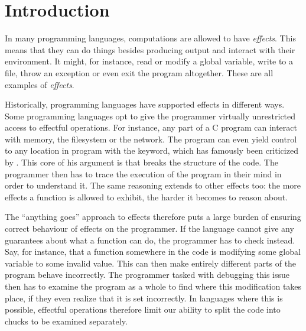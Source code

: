 \chapter{Introduction}\label{chap:introduction}



In many programming languages, computations are allowed to have \emph{effects}. This means that they can do things besides producing output and interact with their environment. It might, for instance, read or modify a global variable, write to a file, throw an exception or even exit the program altogether. These are all examples of \emph{effects}.

Historically, programming languages have supported effects in different ways. Some programming languages opt to give the programmer virtually unrestricted access to effectful operations. For instance, any part of a C program can interact with memory, the filesystem or the network. The program can even yield control to any location in program with the  keyword, which has famously been criticized by \textcite{dijkstra_letters_1968}. This core of his argument is that  breaks the structure of the code. The programmer then has to trace the execution of the program in their mind in order to understand it. The same reasoning extends to other effects too: the more effects a function is allowed to exhibit, the harder it becomes to reason about.

The ``anything goes'' approach to effects therefore puts a large burden of ensuring correct behaviour of effects on the programmer. If the language cannot give any guarantees about what a function can do, the programmer has to check instead. Say, for instance, that a function somewhere in the code is modifying some global variable to some invalid value. This can then make entirely different parts of the program behave incorrectly. The programmer tasked with debugging this issue then has to examine the program as a whole to find where this modification takes place, if they even realize that it is set incorrectly. In languages where this is possible, effectful operations therefore limit our ability to split the code into chucks to be examined separately.


